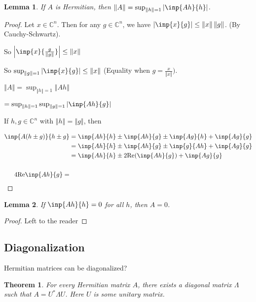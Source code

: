 \documentclass[twofold]{article}
\newcommand*\adj[1]{#1^*}
\newcommand*\norm[1]{\left \Vert #1 \right\Vert}
\newcommand*\abs[1]{\left \vert #1 \right\vert}
\theoremstyle{plain}
\newtheorem{theorem}{Theorem}
\newtheorem*{lemma}{Lemma}
\theoremstyle{definition}
\theoremstyle{remark}
\begin{document}
\begin{lemma} If \(A\) is Hermitian, then \(\norm{A} = \sup_{\norm{h} = 1} \abs{\inp{Ah}{h}}\).\end{lemma}
\begin{proof} Let \(x \in \mathbb{C}^n\). Then for any \(g \in \mathbb{C}^n\), we have \(\abs{\inp{x}{g}} \le \norm{x} \norm{g}\). (By Cauchy-Schwartz).

So \(\abs{\inp{x}{\frac{g}{\norm{g}}}} \le \norm{x}\) 

So \(\sup_{\norm{g} = 1} \abs{\inp{x}{g}} \le \norm{x} \) (Equality when \(g = \frac{x}{\norm{x}})\).

\(\norm{A} = \sup_{\norm{h} = 1} \norm{Ah}\)

\(= \sup_{\norm{h} = 1} \sup_{\norm{g}=1} \abs{\inp{Ah}{g}}  \)

If \(h, g \in \mathbb{C}^n\) with \(\norm{h} = \norm{g}\), then

\begin{equation*} \begin{split}
\inp{A (h \pm g)}{h\pm g} & = \inp{Ah}{h} \pm \inp{Ah}{g} \pm \inp{Ag}{h} + \inp{Ag}{g} \\
& = \inp{Ah}{h} \pm \inp{Ah}{g} \pm \inp{g}{Ah} + \inp{Ag}{g} \\
& = \inp{Ah}{h} \pm 2 \text{Re}(\inp{Ah}{g}) + \inp{Ag}{g} \\ \\
4 \text{Re}\inp{Ah}{g} = 
\end{split} \end{equation*}
\end{proof}


\begin{lemma} If \(\inp{Ah}{h} = 0\) for all \(h\), then \(A = 0\).\end{lemma}
\begin{proof} Left to the reader \end{proof}


\subsection{Diagonalization}

Hermitian matrices can be diagonalized?

\begin{theorem}  For every Hermitian matrix \(A\), there exists a diagonal matrix \(\Lambda\) such that \(A = \adj{U}  \Lambda U\). Here \(U\) is some unitary matrix. \end{theorem}
\end{document}
